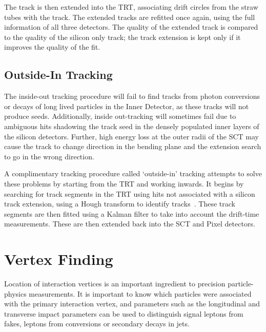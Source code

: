 The track is then extended into the TRT, associating drift circles from the
straw tubes with the track. The extended tracks are refitted once again, using
the full information of all three detectors. The quality of the extended track
is compared to the quality of the silicon only track; the track extension is
kept only if it improves the quality of the fit.

\subsection{Outside-In Tracking}

The inside-out tracking procedure will fail to find tracks from photon conversions or
decays of long lived particles in the Inner Detector, as these tracks will not
produce seeds. Additionally, inside out-tracking will sometimes fail due to
ambiguous hits shadowing the track seed in the densely populated inner layers of
the silicon detectors. Further, high energy loss at the outer radii of the SCT may cause
the track to change direction in the bending plane and the extension search to
go in the wrong direction. 

A complimentary tracking procedure called `outside-in'
tracking attempts to solve these problems by starting from the TRT and working
inwards. It begins by searching for track segments in the TRT using hits not
associated with a silicon track extension, using a Hough transform to identify
tracks~\cite{Baines:683897}. These track segments are then fitted using a Kalman
filter to take into account the drift-time measurements. These are then extended back into the
SCT and Pixel detectors.

\section{Vertex Finding}
\label{sec:reco-vertexing}

Location of interaction vertices is an important ingredient to precision
particle-physics measurements. It is important to know which particles were
associated with the primary interaction vertex, and parameters such as the
longitudinal and transverse impact parameters can be used to distinguish signal
leptons from fakes, leptons from conversions or secondary decays in jets.

